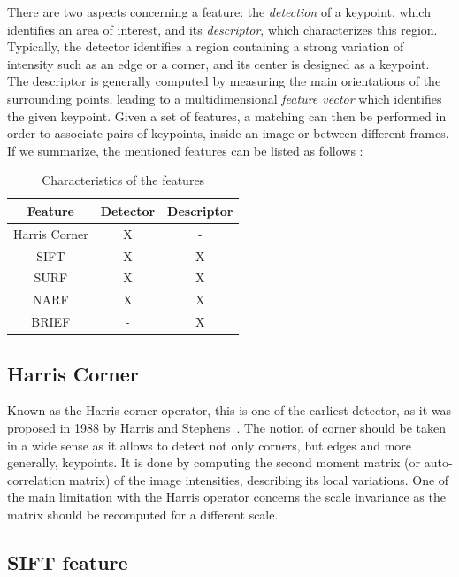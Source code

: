 There are two aspects concerning a feature: the \emph{detection} of a keypoint, which identifies an area of interest, and its \emph{descriptor}, which characterizes this region. Typically, the detector identifies a region containing a strong variation of intensity such as an edge or a corner, and its center is designed as a keypoint. The descriptor is generally computed by measuring the main orientations of the surrounding points, leading to a multidimensional \emph{feature vector} which identifies the given keypoint. Given a set of features, a matching can then be performed in order to associate pairs of keypoints, inside an image or between different frames. If we summarize, the mentioned features can be listed as follows :

\begin {table}
 \begin{center}
  \begin{tabular}{c|cc}
  \hline
  Feature & Detector & Descriptor \\
  \hline
  Harris Corner & X & - \\
  SIFT & X & X \\
  SURF & X & X \\
  NARF & X & X \\
  BRIEF & - & X \\
  \hline
  \end{tabular}
 \end{center}
\caption {Characteristics of the features}
\end{table}

\subsection{Harris Corner}

Known as the Harris corner operator, this is one of the earliest detector, as it was proposed in 1988 by Harris and Stephens~\cite{Harris88alvey}. The  notion of corner should be taken in a wide sense as it allows to detect not only corners, but edges and more generally, keypoints. It is done by computing the second moment matrix (or auto-correlation matrix) of the image intensities, describing its local variations. One of the main limitation with the Harris operator concerns the scale invariance as the matrix should be recomputed for a different scale.

\subsection{SIFT feature}

